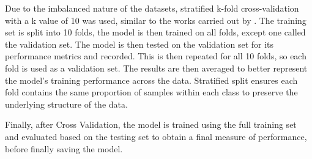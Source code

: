 Due to the imbalanced nature of the datasets, stratified k-fold cross-validation with a k value of 10 was used, similar to the works carried out by \textcite{s22155633}. The training set is split into 10 folds, the model is then trained on all folds, except one called the validation set. The model is then tested on the validation set for its performance metrics and recorded. This is then repeated for all 10 folds, so each fold is used as a validation set. The results are then averaged to better represent the model's training performance across the data. Stratified split ensures each fold contains the same proportion of samples within each class to preserve the underlying structure of the data. 

Finally, after Cross Validation, the model is trained using the full training set and evaluated based on the testing set to obtain a final measure of performance, before finally saving the model.